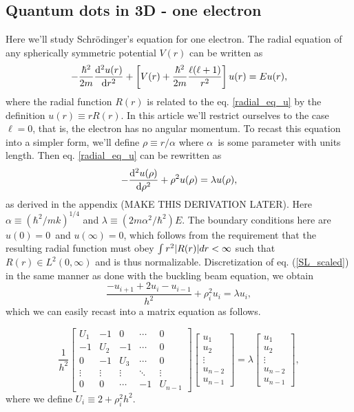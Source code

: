 \documentclass[english,notitlepage,reprint]{revtex4-1}  %
\begin{document}
\subsection*{Quantum dots in 3D - one electron}

Here we'll study Schrödinger's equation for one electron. The radial equation of any spherically symmetric potential $V(r)$ can be written as 
\begin{equation}\label{radial_eq_u}
	-\frac{\hbar^2}{2m}\dv[2]{u(r)}{r} + \left[V(r) + \frac{\hbar^2}{2m}\frac{\ell(\ell + 1)}{r^2}\right]u(r) = Eu(r),
\end{equation}
where the radial function $R(r)$ is related to the eq. \eqref{radial_eq_u} by the definition $u(r) \equiv rR(r)$. In this article we'll restrict ourselves to the case $\ell = 0$, that is, the electron has no angular momentum. To recast this equation into a simpler form, we'll define $\rho \equiv r/\alpha$ where $\alpha$ is some parameter with units length. Then eq. \eqref{radial_eq_u} can be rewritten as 
\begin{equation}\label{SL_scaled}
	-\dv[2]{u(\rho)}{\rho} + \rho^2 u(\rho) = \lambda u(\rho),
\end{equation}
as derived in the appendix (MAKE THIS DERIVATION LATER). Here $\alpha \equiv (\hbar^2/mk)^{1/4}$ and $\lambda \equiv (2m\alpha^2/\hbar^2)E$. The boundary conditions here are $u(0) = 0$ and $u(\infty) = 0$, which follows from the requirement that the resulting radial function must obey $\int r^2\abs{R(r)}dr < \infty$ such that $R(r) \in L^2(0,\infty)$ and is thus normalizable. 
Discretization of eq. (\ref{SL_scaled}) in the same manner as done with the buckling beam equation, we obtain 
\begin{equation}
	\frac{-u_{i+1} + 2u_i - u_{i-1}}{h^2} + \rho_i^2u_i = \lambda u_i,
\end{equation}
which we can easily recast into a matrix equation as follows.

\begin{equation}\label{matrix_eq_1}
\frac{1}{h^2}
\begin{bmatrix}
U_1 & -1 & 0 & \cdots & 0 \\
-1 & U_2 & -1 & \cdots& 0  \\
0 & -1 & U_3 & \cdots & 0\\
\vdots & \vdots & \vdots & \ddots & \vdots \\
0 & 0 & \cdots & -1 & U_{n-1}
\end{bmatrix}
\begin{bmatrix}
u_1 \\ u_2 \\ \vdots \\ u_{n-2} \\ u_{n-1}
\end{bmatrix}
= \lambda 
\begin{bmatrix}
u_1 \\ u_2 \\ \vdots \\ u_{n-2} \\ u_{n-1}
\end{bmatrix},
\end{equation}
where we define $U_i \equiv 2 + \rho_i^2h^2$.
\end{document}
